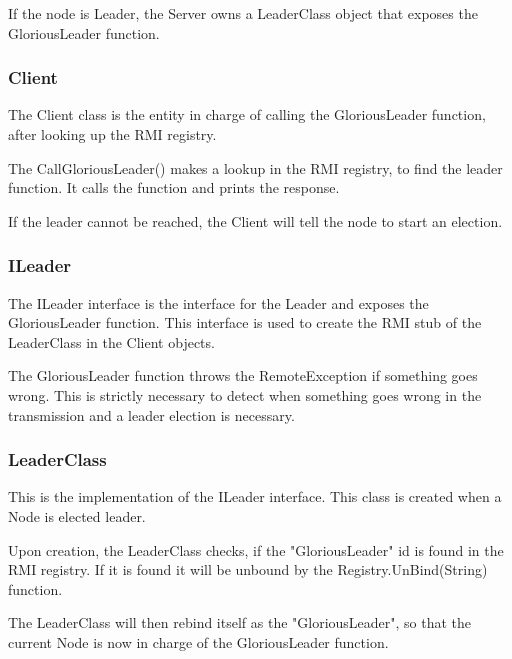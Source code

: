 If the node is Leader, the Server owns a LeaderClass object that exposes the GloriousLeader function. 

\subsubsection{Client}
The Client class is the entity in charge of calling the GloriousLeader function, after looking up the RMI registry.

The CallGloriousLeader() makes a lookup in the RMI registry, to find the leader function. It calls the function and prints the response.

\begin{center}
\end{center}

If the leader cannot be reached, the Client will tell the node to start an election. 

\subsubsection{ILeader}
The ILeader interface is the interface for the Leader and exposes the GloriousLeader function. This interface is used to create the RMI stub of the LeaderClass in the Client objects.

\begin{center}
\end{center}

The GloriousLeader function throws the RemoteException if something goes wrong. This is strictly necessary to detect when something goes wrong in the transmission and a leader election is necessary.

\subsubsection{LeaderClass}
This is the implementation of the ILeader interface. This class is created when a Node is elected leader.

Upon creation, the LeaderClass checks, if the "GloriousLeader" id is found in the RMI registry. If it is found it will be unbound by the Registry.UnBind(String) function. 

The LeaderClass will then rebind itself as the "GloriousLeader", so that the current Node is now in charge of the GloriousLeader function.

